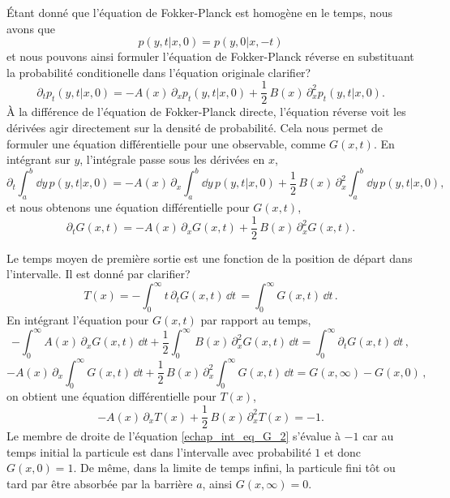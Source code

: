 \documentclass[openany,a4paper,12pt]{article}
\begin{document}
\par Étant donné que l'équation de Fokker-Planck est homogène en le temps, nous avons que 
%
\begin{equation}\label{echap_homogeneite_p}
	p(y,t|x,0) = p(y,0|x,-t)
\end{equation}
%
et nous pouvons ainsi formuler l'équation de Fokker-Planck réverse en substituant la probabilité conditionelle dans l'équation originale {\color{red} clarifier?} 
%
\begin{equation}\label{echap_eq_FP_backward}
	\partial_t p_t(y,t|x,0) = -A(x)\, \partial_x p_t(y,t|x,0) + \frac 12 \, B(x)\, \partial_x^2 p_t(y,t|x,0).
\end{equation}
%
À la différence de l'équation de Fokker-Planck directe, l'équation réverse voit les dérivées agir directement sur la densité de probabilité. Cela nous permet de formuler une équation différentielle pour une observable, comme $G(x,t)$. En intégrant sur $y$, l'intégrale passe sous les dérivées en $x$,
%
\begin{equation}\label{echao_int_FP_backward}
	\partial_t \int_a^b \dd y \, p(y,t|x,0) = - A(x) \, \partial_x \int_a^b \dd y \, p(y,t|x,0) + \frac 12 \, B(x) \, \partial_x^2 \int_a^b \dd y \, p(y,t|x,0),
\end{equation}
%
et nous obtenons une équation différentielle pour $G(x,t)$,
%
\begin{equation}\label{echap_eq_G}
	\partial_t G(x,t) = - A(x) \, \partial_x G(x,t) + \frac 12 \, B(x) \, \partial_x^2 G(x,t).
\end{equation}
%

\par Le temps moyen de première sortie est une fonction de la position de départ dans l'intervalle. Il est donné par {\color{red} clarifier?}
%
\begin{equation}\label{echap_expr_Tx}
	T(x) = - \int_0^\infty t \, \partial_t G(x,t) \, \dd t \, = \int_0^\infty  G(x,t) \, \dd t \, .
\end{equation}
%
En intégrant l'équation pour $G(x,t)$ par rapport au temps,
%
\begin{equation}\label{echap_int_eq_G_1}
	 - \int_0^\infty A(x) \, \partial_x G(x,t) \, \dd t + \frac 12 \int_0^\infty \, B(x) \, \partial_x^2 G(x,t) \, \dd t = \int_0^\infty \partial_t G(x,t) \, \dd t \, ,
\end{equation}
%
\begin{equation}\label{echap_int_eq_G_2}
	- A(x) \, \partial_x \int_0^\infty G(x,t) \, \dd t + \frac 12 \, B(x) \, \partial_x^2 \int_0^\infty G(x,t) \, \dd t = G(x,\infty) - G(x,0) \, ,
\end{equation}
%
on obtient une équation différentielle pour $T(x)$,
%
\begin{equation}\label{echap_eq_T}
	-A(x) \, \partial_x T(x) + \frac 12 \, B(x) \, \partial_x^2 T(x) = -1.
\end{equation}
%
Le membre de droite de l'équation \ref{echap_int_eq_G_2} s'évalue à $-1$ car au temps initial la particule est dans l'intervalle avec probabilité $1$ et donc $G(x,0)=1$. De même, dans la limite de temps infini, la particule fini tôt ou tard par être absorbée par la barrière $a$, ainsi $G(x,\infty)=0$. 
\end{document}
